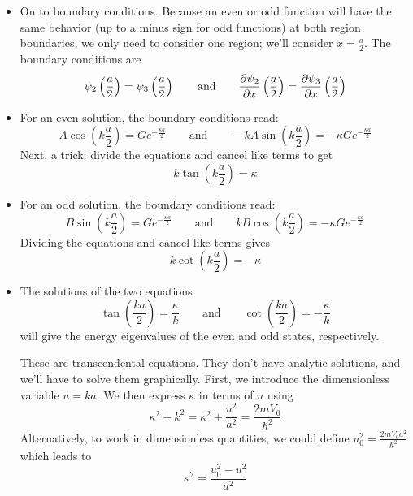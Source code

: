 \documentclass[11pt, a4paper]{article}
\newcommand{\eqtext}[1]{\qquad \text{#1} \qquad}
\begin{document}
\begin{itemize}
	\item On to boundary conditions. Because an even or odd function will have the same behavior (up to a minus sign for odd functions) at both region boundaries, we only need to consider one region; we'll consider $ x = \frac{a}{2} $. The boundary conditions are
	\begin{equation*}
		\psi_{2}\left(\frac{a}{2}\right) = \psi_{3}\left(\frac{a}{2}\right) \eqtext{and} \pdv{\psi_{2}}{x}\left(\frac{a}{2}\right) = \pdv{\psi_{3}}{x}\left(\frac{a}{2}\right) 
	\end{equation*}
	
	\item For an even solution, the boundary conditions read:
	\begin{equation*}
		A \cos\left(k\frac{a}{2}\right) = Ge^{-\frac{\kappa a}{2}} \eqtext{and} -kA\sin(k\frac{a}{2}) = - \kappa Ge^{-\frac{\kappa a}{2}}
	\end{equation*}
	Next, a trick: divide the equations and cancel like terms to get
	\begin{equation*}
		k \tan (k\frac{a}{2}) = \kappa 
	\end{equation*}
	
	\item For an odd solution, the boundary conditions read:
	\begin{equation*}
		B \sin \left(k\frac{a}{2}\right) = Ge^{-\frac{\kappa a}{2}} \eqtext{and} kB\cos(k\frac{a}{2}) = -\kappa Ge^{-\frac{\kappa a}{2}}
	\end{equation*}
	Dividing the equations and cancel like terms gives
	\begin{equation*}
		k \cot (k\frac{a}{2}) = -\kappa 
	\end{equation*}
	
	\item The solutions of the two equations
	\begin{equation*}
		\tan (\frac{ka}{2}) = \frac{\kappa}{k}  \eqtext{and}  \cot (\frac{ka}{2}) = -\frac{\kappa}{k} 
	\end{equation*}
	will give the energy eigenvalues of the even and odd states, respectively. 
	
	These are transcendental equations. They don't have analytic solutions, and we'll have to solve them graphically. First, we introduce the dimensionless variable $ u = k a $. We then express $ \kappa $ in terms of $ u $ using
	\begin{equation*}
		\kappa^{2} + k^{2} = \kappa^{2} + \frac{u^{2}}{a^{2}}  = \frac{2mV_{0}}{\hbar^{2}}
	\end{equation*}
	Alternatively, to work in dimensionless quantities, we could define $ u_{0}^{2} = \frac{2mV_{0}a^{2}}{\hbar^{2}} $ which leads to
	\begin{equation*}
		\kappa^{2} = \frac{u_{0}^{2} - u^{2}}{a^{2}}
	\end{equation*}
	

\end{itemize}
\end{document}
